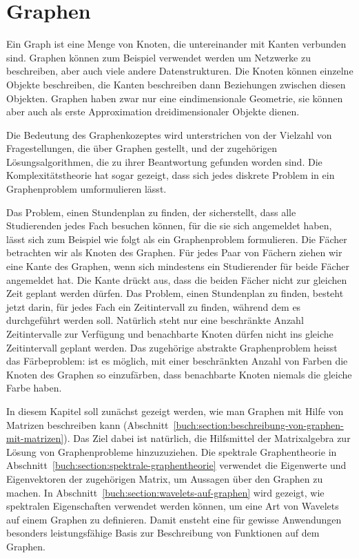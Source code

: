 %
%
%
\chapter{Graphen
\label{buch:chapter:graphen}}
\rhead{}
Ein Graph ist eine Menge von Knoten, die untereinander mit Kanten
verbunden sind.
Graphen können zum Beispiel verwendet werden um Netzwerke zu beschreiben,
aber auch viele andere Datenstrukturen.
%
Die Knoten können einzelne Objekte beschreiben, die Kanten beschreiben
dann Beziehungen zwischen diesen Objekten.
Graphen haben zwar nur eine eindimensionale Geometrie, sie können aber auch als
erste Approximation dreidimensionaler Objekte dienen.

Die Bedeutung des Graphenkozeptes wird unterstrichen von der Vielzahl
von Fragestellungen, die über Graphen gestellt, und der
zugehörigen Lösungsalgorithmen, die zu ihrer Beantwortung gefunden
worden sind.
Die Komplexitätstheorie hat sogar gezeigt, dass sich jedes diskrete
Problem in ein Graphenproblem umformulieren lässt.
%

Das Problem, einen Stundenplan zu finden, der sicherstellt, dass
alle Studierenden jedes Fach besuchen können, für die sie sich
angemeldet haben, lässt sich zum Beispiel wie folgt als ein
Graphenproblem formulieren.
Die Fächer betrachten wir als Knoten des Graphen.
Für jedes Paar von Fächern ziehen wir eine Kante des Graphen, wenn 
sich mindestens ein Studierender für beide Fächer angemeldet hat.
Die Kante drückt aus, dass die beiden Fächer nicht zur gleichen Zeit
geplant werden dürfen.
Das Problem, einen Stundenplan zu finden, besteht jetzt darin, für
jedes Fach ein Zeitintervall zu finden, während dem es durchgeführt
werden soll.
%
Natürlich steht nur eine beschränkte Anzahl Zeitintervalle zur Verfügung
und benachbarte Knoten dürfen nicht ins gleiche Zeitintervall geplant
werden.
Das zugehörige abstrakte Graphenproblem heisst das Färbeproblem: 
%
ist es möglich, mit einer beschränkten Anzahl von Farben die Knoten
des Graphen so einzufärben, dass benachbarte Knoten niemals die gleiche
Farbe haben.

In diesem Kapitel soll zunächst gezeigt werden, wie man Graphen mit 
Hilfe von Matrizen beschreiben kann
(Abschnitt~\ref{buch:section:beschreibung-von-graphen-mit-matrizen}).
Das Ziel dabei ist natürlich, die Hilfsmittel der Matrixalgebra
zur Lösung von Graphenprobleme hinzuzuziehen.
Die spektrale Graphentheorie in
Abschnitt~\ref{buch:section:spektrale-graphentheorie} verwendet
die Eigenwerte und Eigenvektoren der zugehörigen Matrix, um Aussagen
über den Graphen zu machen.
%
In Abschnitt~\ref{buch:section:wavelets-auf-graphen} wird gezeigt,
wie spektralen Eigenschaften verwendet werden können, um eine
Art von Wavelets auf einem Graphen zu definieren.
Damit ensteht eine für gewisse Anwendungen besonders leistungsfähige
Basis zur Beschreibung von Funktionen auf dem Graphen.






